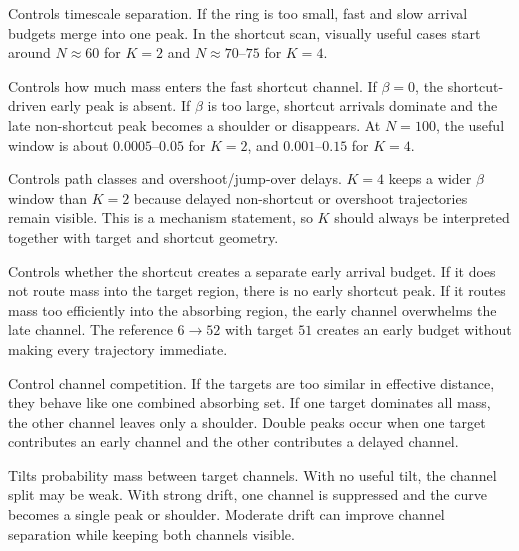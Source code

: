 \documentclass[11pt]{article}
\begin{document}
\begin{description}[style=nextline,leftmargin=2.0cm,labelwidth=1.7cm,itemsep=0.35em]
\item[\(N\) or \(L\)]
Controls timescale separation. If the ring is too small, fast and slow arrival
budgets merge into one peak. In the shortcut scan, visually useful cases start
around \(N\approx60\) for \(K=2\) and \(N\approx70\)--\(75\) for \(K=4\).

\item[\(\beta\)]
Controls how much mass enters the fast shortcut channel. If \(\beta=0\), the
shortcut-driven early peak is absent. If \(\beta\) is too large, shortcut
arrivals dominate and the late non-shortcut peak becomes a shoulder or
disappears. At \(N=100\), the useful window is about \(0.0005\)--\(0.05\) for
\(K=2\), and \(0.001\)--\(0.15\) for \(K=4\).

\item[\(K\)]
Controls path classes and overshoot/jump-over delays. \(K=4\) keeps a wider
\(\beta\) window than \(K=2\) because delayed non-shortcut or overshoot
trajectories remain visible. This is a mechanism statement, so \(K\) should
always be interpreted together with target and shortcut geometry.

\item[Shortcut placement]
Controls whether the shortcut creates a separate early arrival budget. If it
does not route mass into the target region, there is no early shortcut peak.
If it routes mass too efficiently into the absorbing region, the early channel
overwhelms the late channel. The reference \(6\to52\) with target \(51\)
creates an early budget without making every trajectory immediate.

\item[Targets and start]
Control channel competition. If the targets are too similar in effective
distance, they behave like one combined absorbing set. If one target dominates
all mass, the other channel leaves only a shoulder. Double peaks occur when
one target contributes an early channel and the other contributes a delayed
channel.

\item[Drift \(g\)]
Tilts probability mass between target channels. With no useful tilt, the
channel split may be weak. With strong drift, one channel is suppressed and
the curve becomes a single peak or shoulder. Moderate drift can improve
channel separation while keeping both channels visible.
\end{description}
\end{document}
